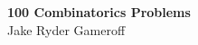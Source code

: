 \documentclass{article}
\begin{document}
\begin{center}
	\textbf{\large 100 Combinatorics Problems} \\
    \large Jake Ryder Gameroff 
\end{center}


\end{document}
